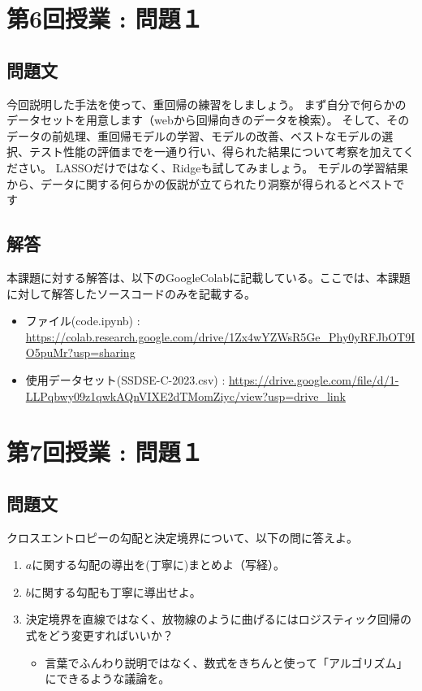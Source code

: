 \documentclass{article}[jsarticle]
\begin{document}
\section{第6回授業 : 問題１}

    \subsection{問題文}
    今回説明した手法を使って、重回帰の練習をしましょう。
    まず自分で何らかのデータセットを用意します（webから回帰向きのデータを検索）。
    そして、そのデータの前処理、重回帰モデルの学習、モデルの改善、ベストなモデルの選択、テスト性能の評価までを一通り行い、得られた結果について考察を加えてください。
    LASSOだけではなく、Ridgeも試してみましょう。
    モデルの学習結果から、データに関する何らかの仮説が立てられたり洞察が得られるとベストです
    \subsection{解答}
    本課題に対する解答は、以下のGoogleColabに記載している。ここでは、本課題に対して解答したソースコードのみを記載する。
    \begin{itemize}
        \item ファイル(code.ipynb) : \url{https://colab.research.google.com/drive/1Zx4wYZWsR5Ge_Phy0yRFJbOT9IO5puMr?usp=sharing}
        \item 使用データセット(SSDSE-C-2023.csv) : \url{https://drive.google.com/file/d/1-LLPqbwy09z1qwkAQnVIXE2dTMomZiyc/view?usp=drive_link}
    \end{itemize}


\section{第7回授業 : 問題１}

    \subsection{問題文}
    クロスエントロピーの勾配と決定境界について、以下の問に答えよ。
    \begin{enumerate}
        \item $a$に関する勾配の導出を(丁寧に)まとめよ（写経）。
        \item $b$に関する勾配も丁寧に導出せよ。
        \item 決定境界を直線ではなく、放物線のように曲げるにはロジスティック回帰の式をどう変更すればいいか？
        \begin{itemize}
            \item 言葉でふんわり説明ではなく、数式をきちんと使って「アルゴリズム」にできるような議論を。
        \end{itemize}
    \end{enumerate}
\end{document}
